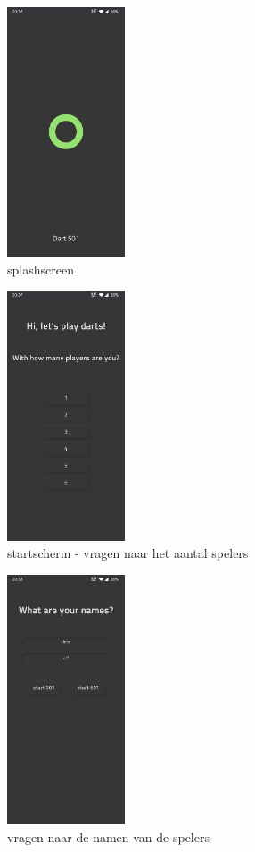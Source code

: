 	\begin{figure}[H]
		\centering
		\includegraphics[width=35mm]{./img/dart1.jpg}{}
		\caption{splashscreen}
	\end{figure}
	
	\begin{figure}[H]
		\centering
		\includegraphics[width=35mm]{./img/dart2.jpg}{}
		\caption{startscherm - vragen naar het aantal spelers}
	\end{figure}
	
	\begin{figure}[H]
		\centering
		\includegraphics[width=35mm]{./img/dart3.jpg}{}
		\caption{vragen naar de namen van de spelers}
	\end{figure}
	
